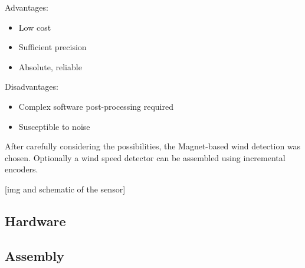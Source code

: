 Advantages:
\begin{itemize}
\item Low cost
\item Sufficient precision
\item Absolute, reliable
\end{itemize}

Disadvantages:
\begin{itemize}
\item Complex software post-processing required
\item Susceptible to noise
\end{itemize}


After carefully considering the possibilities, the Magnet-based wind detection was chosen. Optionally a wind speed detector can be assembled using incremental encoders.

[img and schematic of the sensor]

\subsection{Hardware}

\subsection{Assembly}